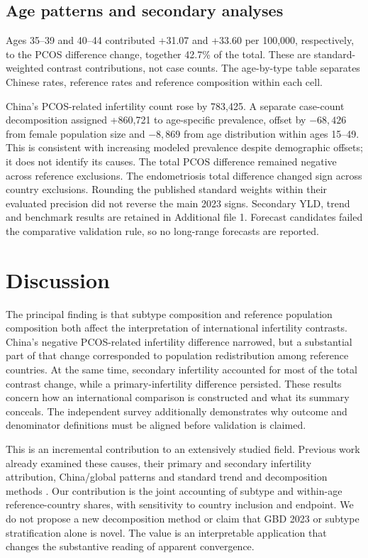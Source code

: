 \documentclass[11pt,a4paper]{article}
\begin{document}

\subsection{Age patterns and secondary analyses}
Ages 35--39 and 40--44 contributed +31.07 and +33.60 per 100,000, respectively, to the PCOS difference change, together 42.7\% of the total. These are standard-weighted contrast contributions, not case counts. The age-by-type table separates Chinese rates, reference rates and reference composition within each cell.

China's PCOS-related infertility count rose by 783,425. A separate case-count decomposition assigned +860,721 to age-specific prevalence, offset by $-68,426$ from female population size and $-8,869$ from age distribution within ages 15--49. This is consistent with increasing modeled prevalence despite demographic offsets; it does not identify its causes. The total PCOS difference remained negative across reference exclusions. The endometriosis total difference changed sign across country exclusions. Rounding the published standard weights within their evaluated precision did not reverse the main 2023 signs. Secondary YLD, trend and benchmark results are retained in Additional file 1. Forecast candidates failed the comparative validation rule, so no long-range forecasts are reported.


\section{Discussion}
The principal finding is that subtype composition and reference population composition both affect the interpretation of international infertility contrasts. China's negative PCOS-related infertility difference narrowed, but a substantial part of that change corresponded to population redistribution among reference countries. At the same time, secondary infertility accounted for most of the total contrast change, while a primary-infertility difference persisted. These results concern how an international comparison is constructed and what its summary conceals. The independent survey additionally demonstrates why outcome and denominator definitions must be aligned before validation is claimed.

This is an incremental contribution to an extensively studied field. Previous work already examined these causes, their primary and secondary infertility attribution, China/global patterns and standard trend and decomposition methods \cite{xu,lu,wang,feng}. Our contribution is the joint accounting of subtype and within-age reference-country shares, with sensitivity to country inclusion and endpoint. We do not propose a new decomposition method or claim that GBD 2023 or subtype stratification alone is novel. The value is an interpretable application that changes the substantive reading of apparent convergence.
\end{document}
